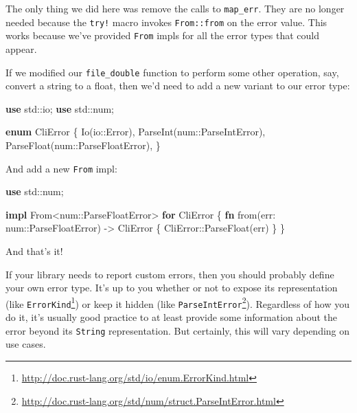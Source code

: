 \documentclass[a4paper,]{book}
\newenvironment{Shaded}{\begin{snugshade}}{\end{snugshade}}
\newcommand{\KeywordTok}[1]{\textcolor[rgb]{0.13,0.29,0.53}{\textbf{{#1}}}}
\newcommand{\NormalTok}[1]{{#1}}
\renewcommand{\href}[2]{#2\footnote{\url{#1}}}
\begin{document}
The only thing we did here was remove the calls to \texttt{map\_err}.
They are no longer needed because the \texttt{try!} macro invokes
\texttt{From::from} on the error value. This works because we've
provided \texttt{From} impls for all the error types that could appear.

If we modified our \texttt{file\_double} function to perform some other
operation, say, convert a string to a float, then we'd need to add a new
variant to our error type:

\begin{Shaded}
\begin{Highlighting}[]
\KeywordTok{use} \NormalTok{std::io;}
\KeywordTok{use} \NormalTok{std::num;}

\KeywordTok{enum} \NormalTok{CliError \{}
    \NormalTok{Io(io::Error),}
    \NormalTok{ParseInt(num::ParseIntError),}
    \NormalTok{ParseFloat(num::ParseFloatError),}
\NormalTok{\}}
\end{Highlighting}
\end{Shaded}

And add a new \texttt{From} impl:

\begin{Shaded}
\begin{Highlighting}[]

\KeywordTok{use} \NormalTok{std::num;}

\KeywordTok{impl} \NormalTok{From<num::ParseFloatError> }\KeywordTok{for} \NormalTok{CliError \{}
    \KeywordTok{fn} \NormalTok{from(err: num::ParseFloatError) -> CliError \{}
        \NormalTok{CliError::ParseFloat(err)}
    \NormalTok{\}}
\NormalTok{\}}
\end{Highlighting}
\end{Shaded}

And that's it!


If your library needs to report custom errors, then you should probably
define your own error type. It's up to you whether or not to expose its
representation (like
\href{http://doc.rust-lang.org/std/io/enum.ErrorKind.html}{\texttt{ErrorKind}})
or keep it hidden (like
\href{http://doc.rust-lang.org/std/num/struct.ParseIntError.html}{\texttt{ParseIntError}}).
Regardless of how you do it, it's usually good practice to at least
provide some information about the error beyond its \texttt{String}
representation. But certainly, this will vary depending on use cases.
\end{document}
